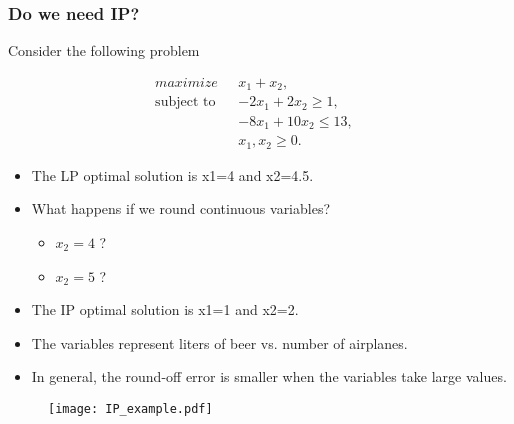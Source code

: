 \documentclass[11pt]{beamer}
\begin{document}
\begin{frame}
\frametitle{Do we need IP?}
Consider the following problem
  
\begin{align}
\displaystyle maximize \mbox{ } & x_1 + x_2, \label{iplp:objective} \\
% 
\mbox{subject to }&-2 x_1 + 2x_2  \geq 1, &  \label{iplp:c1}\\
&-8x_1 + 10 x_2  \leq 13, &   \label{iplp:c2}\\
& x_1, x_2 \geq 0. &  \label{iplp:domain}
\end{align}
 
  
\begin{itemize}
\item<1-> The LP optimal solution is x1=4 and x2=4.5.
\item<2-> What happens if we round continuous variables?
\pause
\begin{itemize}
\item $x_2 = 4$ ?
\item $x_2 = 5$ ?
\end{itemize}
\item<3-> The IP optimal solution is x1=1 and x2=2.
\item<4-> The variables represent liters of beer vs. number of airplanes.
\item<5-> In general, the round-off error is smaller when the variables take large values.
\end{itemize}
\end{frame}

\begin{frame}
\begin{figure}
\centering
\texttt{[image: IP\_example.pdf]}
\end{figure}
\end{frame}
\end{document}
